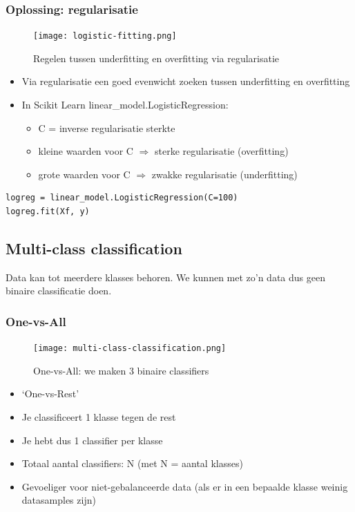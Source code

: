 \documentclass{article}
\begin{document}
\subsubsection{Oplossing: regularisatie}

\begin{figure}[H]
    \centering
    \texttt{[image: logistic-fitting.png]}
    \caption{Regelen tussen underfitting en overfitting via regularisatie}
\end{figure}

\begin{itemize}
    \item Via regularisatie een goed evenwicht zoeken tussen underfitting en overfitting
    \item In Scikit Learn linear\_model.LogisticRegression:
    \begin{itemize}
        \item C = inverse regularisatie sterkte
        \item kleine waarden voor C $\Rightarrow$ sterke regularisatie (overfitting)
        \item grote waarden voor C $\Rightarrow$ zwakke regularisatie (underfitting)
    \end{itemize}
\end{itemize}

\begin{verbatim}
logreg = linear_model.LogisticRegression(C=100)
logreg.fit(Xf, y)
\end{verbatim}

\subsection{Multi-class classification}

Data kan tot meerdere klasses behoren.
We kunnen met zo'n data dus geen binaire classificatie doen.


\subsubsection{One-vs-All}

\begin{figure}[H]
    \centering
    \texttt{[image: multi-class-classification.png]}
    \caption{One-vs-All: we maken 3 binaire classifiers}
\end{figure}


\begin{itemize}
    \item `One-vs-Rest'
    \item Je classificeert 1 klasse tegen de rest
    \item Je hebt dus 1 classifier per klasse
    \item Totaal aantal classifiers: N (met N = aantal klasses)
    \item Gevoeliger voor niet-gebalanceerde data (als er in een bepaalde klasse weinig datasamples zijn)
\end{itemize}
\end{document}
